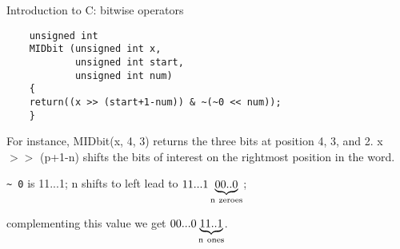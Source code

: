 \begin{frame}[fragile]{Introduction to C: bitwise operators}

\begin{tt}
\begin{verbatim}
    unsigned int
    MIDbit (unsigned int x,
            unsigned int start,
            unsigned int num)
    {
    return((x >> (start+1-num)) & ~(~0 << num));
    }
\end{verbatim}
\end{tt}


\vspace{10pt}

For instance,
MIDbit(x, 4, 3) returns the three bits at position 4, 3, and 2.
x $>>$ (p+1-n) shifts the bits of interest on the rightmost
position in the word.


\vspace{10pt}

{\tt \~{} 0} is 11...1; n shifts to left lead to
$11...1\underbrace{00..0}_{\rm n\ zeroes}$;


\vspace{10pt}

complementing this value
we get
$00...0\underbrace{11..1}_{\rm n\ ones}$.




\end{frame}

